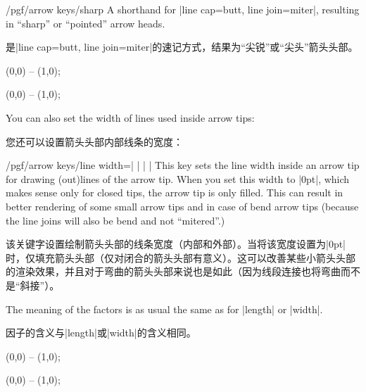 \begin{key}{/pgf/arrow keys/sharp}
    A shorthand for |line cap=butt, line join=miter|, resulting in ``sharp'' or
    ``pointed'' arrow heads.
    
    是|line cap=butt, line join=miter|的速记方式，结果为“尖锐”或“尖头”箭头头部。
\begin{codeexample}[width=3cm,preamble={\usetikzlibrary{arrows.meta}}]
\tikz [line width=2mm]
  \draw [arrows = {-Computer Modern Rightarrow[sharp]}] (0,0) -- (1,0);
\end{codeexample}
\begin{codeexample}[width=3cm,preamble={\usetikzlibrary{arrows.meta}}]
\tikz [line width=2mm]
  \draw [arrows = {-Bracket[reversed,sharp]}] (0,0) -- (1,0);
\end{codeexample}
\end{key}

You can also set the width of lines used inside arrow tips:

您还可以设置箭头头部内部线条的宽度：


\begin{key}{/pgf/arrow keys/line width=| |%
        | |}
    This key sets the line width inside an arrow tip for drawing (out)lines of
    the arrow tip. When you set this width to |0pt|, which makes sense only for
    closed tips, the arrow tip is only filled. This can result in better
    rendering of some small arrow tips and in case of bend arrow tips (because
    the line joins will also be bend and not ``mitered''.)

    该关键字设置绘制箭头头部的线条宽度（内部和外部）。当将该宽度设置为|0pt|时，仅填充箭头头部（仅对闭合的箭头头部有意义）。这可以改善某些小箭头头部的渲染效果，并且对于弯曲的箭头头部来说也是如此（因为线段连接也将弯曲而不是“斜接”）。


    The meaning of the factors is as usual the same as for |length| or |width|.
    
    因子的含义与|length|或|width|的含义相同。
\begin{codeexample}[width=2cm,preamble={\usetikzlibrary{arrows.meta}}]
\tikz \draw [arrows = {-Latex[line width=0.1pt, fill=white, length=10pt]}] (0,0) -- (1,0);
\end{codeexample}
\begin{codeexample}[width=2cm,preamble={\usetikzlibrary{arrows.meta}}]
\tikz \draw [arrows = {-Latex[line width=1pt, fill=white, length=10pt]}] (0,0) -- (1,0);
\end{codeexample}
\end{key}

